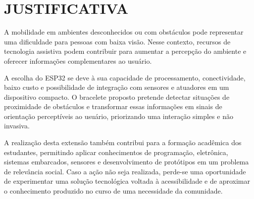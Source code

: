 \chapter{JUSTIFICATIVA}
\label{capitulo-justificativa}

A mobilidade em ambientes desconhecidos ou com obstáculos pode representar uma dificuldade para pessoas com baixa visão. Nesse contexto, recursos de tecnologia assistiva podem contribuir para aumentar a percepção do ambiente e oferecer informações complementares ao usuário.

A escolha do ESP32 se deve à sua capacidade de processamento, conectividade, baixo custo e possibilidade de integração com sensores e atuadores em um dispositivo compacto. O bracelete proposto pretende detectar situações de proximidade de obstáculos e transformar essas informações em sinais de orientação perceptíveis ao usuário, priorizando uma interação simples e não invasiva.

A realização desta extensão também contribui para a formação acadêmica dos estudantes, permitindo aplicar conhecimentos de programação, eletrônica, sistemas embarcados, sensores e desenvolvimento de protótipos em um problema de relevância social. Caso a ação não seja realizada, perde-se uma oportunidade de experimentar uma solução tecnológica voltada à acessibilidade e de aproximar o conhecimento produzido no curso de uma necessidade da comunidade.